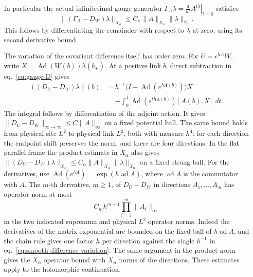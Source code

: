 \documentclass[11pt,letterpaper,reqno]{amsart}
\numberwithin{equation}{section}
\renewcommand{\eqref}[1]{\textup{eq.~\ref{#1}}}
\theoremstyle{definition}
\theoremstyle{remark}
\begin{document}
In particular the actual infinitesimal gauge generator
\(\Gamma_A\lambda=\left.\frac{d}{dt}A^{t\lambda}\right|_{t=0}\)
satisfies
\[
 \|(\Gamma_A-D_W)\lambda\|_{X_\alpha}
                  \leq C_\alpha\|A\|_{X_\alpha}\|\lambda\|_{Y_\alpha}.
\]
This follows by differentiating the remainder with respect to
\(\lambda\) at zero, using its second derivative bound.

The variation of the covariant difference itself has order zero.
For \(U=e^{hA}W\), write \(X=\operatorname{Ad}(W(b))\lambda(b_+)\).
At a positive link \(b\), direct subtraction in \eqref{eq:gauge-D}
gives
\begin{equation}\label{eq:smooth-difference-variation}
 \begin{split}
 ((D_U-D_W)\lambda)(b)
  &=h^{-1}\bigl(I-\operatorname{Ad}(e^{hA(b)})\bigr)X\\
  &=-\int_0^1\operatorname{Ad}(e^{t h A(b)})[A(b),X]\,dt .
 \end{split}
\end{equation}
The integral follows by differentiation of the adjoint action.
It gives \(\|D_U-D_W\|_{\infty\to\infty}\leq C\|A\|_\infty\)
on a fixed potential ball. The same bound holds from physical
site \(L^2\) to physical link \(L^2\), both with measure \(h^4\):
for each direction the endpoint shift preserves the norm, and
there are four directions. In the flat parallel frame the product
estimate in \(X_\alpha\) also gives
\(\|(D_U-D_W)\lambda\|_{X_\alpha}\leq
C_\alpha\|A\|_{X_\alpha}\|\lambda\|_{X_\alpha}\) on a fixed strong
ball. For the derivatives, use
\(\operatorname{Ad}(e^{hA})=\exp(h\operatorname{ad} A)\), where
\(\operatorname{ad} A\) is the commutator with \(A\).
The \(m\)-th derivative, \(m\geq1\), of \(D_U-D_W\) in directions
\(A_1,\ldots,A_m\) has operator norm at most
\[
                   C_m h^{m-1}\prod_{i=1}^m\|A_i\|_\infty
\]
in the two indicated supremum and physical \(L^2\) operator norms.
Indeed the derivatives of the matrix exponential are bounded on
the fixed ball of \(h\operatorname{ad} A\), and the chain rule
gives one factor \(h\) per direction against the single \(h^{-1}\)
in \eqref{eq:smooth-difference-variation}. The same argument in
the product norm gives the \(X_\alpha\) operator bound with
\(X_\alpha\) norms of the directions. These estimates apply to the
holomorphic continuation.
\end{document}
